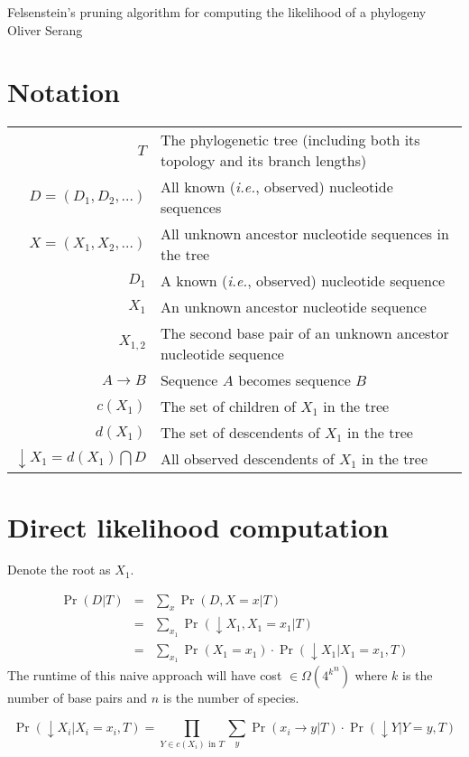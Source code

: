 \documentclass[12pt]{book}
\begin{document}
\noindent Felsenstein's pruning algorithm for computing the likelihood of a phylogeny\newline
\noindent Oliver Serang

\section{Notation}

\begin{tabular}{r|l}
  $T$ & The phylogenetic tree (including both its topology and its branch lengths)\\
  $D = (D_1, D_2, \ldots)$ & All known (\emph{i.e.}, observed) nucleotide sequences\\
  $X = (X_1, X_2, \ldots)$ & All unknown ancestor nucleotide sequences in the tree\\
  $D_1$ & A known (\emph{i.e.}, observed) nucleotide sequence\\
  $X_1$ & An unknown ancestor nucleotide sequence\\
  $X_{1,2}$ & The second base pair of an unknown ancestor nucleotide sequence\\
  $A \rightarrow B$ & Sequence $A$ becomes sequence $B$\\
  $c(X_1)$ & The set of children of $X_1$ in the tree\\
  $d(X_1)$ & The set of descendents of $X_1$ in the tree\\
  $\downarrow X_1 = d(X_1) \bigcap D$ & All observed descendents of $X_1$ in the tree
\end{tabular}

\section{Direct likelihood computation}

Denote the root as $X_1$.

\begin{eqnarray*}
  \Pr(D | T) &=& \sum_x \Pr(D, X=x | T)\\
  &=& \sum_{x_1} \Pr(\downarrow X_1, X_1=x_1 | T)\\
  &=& \sum_{x_1} \Pr(X_1=x_1) \cdot \Pr(\downarrow X_1 | X_1=x_1, T)
\end{eqnarray*}
The runtime of this naive approach will have cost $\in \Omega({4^k}^n)$
where $k$ is the number of base pairs and $n$ is the number of
species.

\[ \Pr(\downarrow X_i | X_i=x_i, T) = \prod_{Y \in c(X_i)\mbox{ in }T} \sum_y \Pr(x_i \rightarrow y | T) \cdot \Pr(\downarrow Y | Y=y, T) \]
\end{document}
